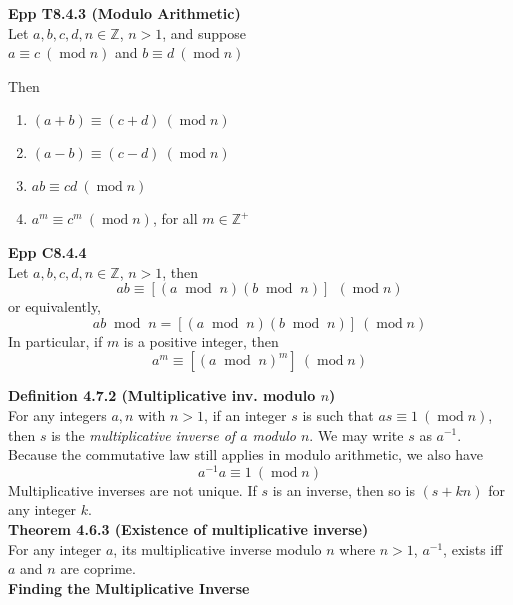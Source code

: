 \documentclass[a4paper]{article}
\newcommand{\subheading}[1]{{\scriptsize\textbf{#1}}}
\renewcommand\mod{\;\operatorname{mod}\;}  %
\newcommand\undermod[1]{\ (\operatorname{mod}#1)}
\begin{document}
\begin{multicols*}{4}
\subheading{Epp T8.4.3 (Modulo Arithmetic)}\\
Let $a, b, c, d, n \in \mathbb{Z}$, $n > 1$, and suppose\\

{\centering
  $a \equiv c \undermod{n}$ and $b \equiv d \undermod{n}$\\
}

Then

\begin{enumerate} \itemsep -0.5em
  \item $(a + b) \equiv (c + d) \undermod{n}$
  \item $(a - b) \equiv (c - d) \undermod{n}$
  \item $ab \equiv cd \undermod{n}$
  \item $a^m \equiv c^m \undermod{n}$, for all $m \in \mathbb{Z}^+$
\end{enumerate}

\subheading{Epp C8.4.4}\\
Let $a, b, c, d, n \in \mathbb{Z}$, $n > 1$, then
$$ ab \equiv [(a \mod n)(b \mod n)]\ \undermod{n} $$
or equivalently,
$$ ab \mod n = [(a \mod n)(b \mod n)] \undermod{n} $$
In particular, if $m$ is a positive integer, then
$$ a^m \equiv [(a \mod n)^m] \undermod{n} $$

\subheading{Definition 4.7.2 (Multiplicative inv. modulo $n$)}\\
For any integers $a, n$ with $n > 1$, if an integer $s$ is such that $as \equiv
1 \undermod{n}$, then $s$ is the \textit{multiplicative inverse of $a$
modulo $n$}. We may write $s$ as $a^{-1}$.\\

Because the commutative law still applies in modulo arithmetic, we also have
$$a^{-1}a \equiv 1 \undermod{n}$$
Multiplicative inverses are not unique. If $s$ is an inverse, then so is $(s +
kn)$ for any integer $k$.\\

\subheading{Theorem 4.6.3 (Existence of multiplicative inverse)}\\
For any integer $a$, its multiplicative inverse modulo $n$ where $n>1$,
$a^{-1}$, exists iff $a$ and $n$ are coprime.\\

\subheading{Finding the Multiplicative Inverse}


\end{multicols*}
\end{document}
